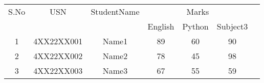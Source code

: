 \documentclass{article}
\begin{document}
\begin{tabular}{|c|c|c|c|c|c|c|}
\hline
S.No & USN & StudentName & \multicolumn{3}{c|}{Marks} \\
\cline{4-6}
 & & & English & Python & Subject3 \\
\hline
1 & 4XX22XX001 & Name1 & 89 & 60 & 90 \\
\hline
2 & 4XX22XX002 & Name2 & 78 & 45 & 98 \\
\hline
3 & 4XX22XX003 & Name3 & 67 & 55 & 59 \\
\hline
\end{tabular}
\end{document}
